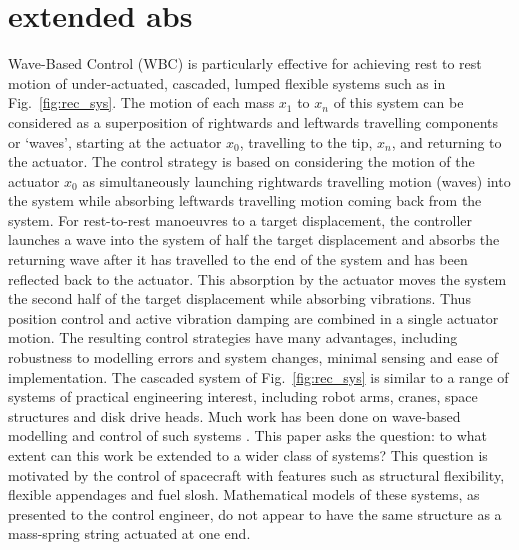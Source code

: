 \documentclass{mbd_fullpaper}
\begin{document}

\section{extended abs}

Wave-Based Control (WBC) is particularly effective for achieving rest to rest motion of under-actuated, cascaded, lumped flexible systems such as in Fig.~\ref{fig:rec_sys}. The motion of each mass $x_1$ to $x_n$ of this system can be considered as a superposition of rightwards and leftwards travelling components or ‘waves’, starting at the actuator $x_0$, travelling to the tip, $x_n$, and returning to the actuator. The control strategy is based on considering the motion of the actuator $x_0$ as simultaneously launching rightwards travelling motion (waves) into the system while absorbing leftwards travelling motion coming back from the system. For rest-to-rest manoeuvres to a target displacement, the controller launches a wave into the system of half the target displacement and absorbs the returning wave after it has travelled to the end of the system and has been reflected back to the actuator. This absorption by the actuator moves the system the second half of the target displacement while absorbing vibrations. Thus position control and active vibration damping are combined in a single actuator motion. The resulting control strategies have many advantages, including robustness to modelling errors and system changes, minimal sensing and ease of implementation.
The cascaded system of Fig.~\ref{fig:rec_sys} is similar to a range of systems of practical engineering interest, including robot arms, cranes, space structures and disk drive heads. Much work has been done on wave-based modelling and control of such systems \cite{OConnor2011, Connor2005}. This paper asks the question: to what extent can this work be extended to a wider class of systems? 
This question is motivated by the control of spacecraft with features such as structural flexibility, flexible appendages and fuel slosh.
Mathematical models of these systems, as presented to the control engineer, do not appear to have the same structure as a mass-spring string actuated at one end.
\end{document}

